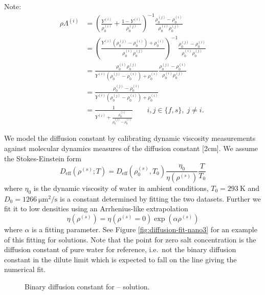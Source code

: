 \documentclass[11pt,twoside]{report}
\begin{document}
Note:
\begin{equation}
  \begin{aligned}
    \rho \Lambda^{(i)} &=
    \left(
    \frac{Y^{(i)}}{\rho^{(i)}_0} +
    \frac{1 - Y^{(i)}}{\rho^{(j)}_0}
    \right)^{-1}
    \frac{\rho^{(j)}_0 - \rho^{(i)}_0}{\rho^{(i)}_0\rho^{(j)}_0} \\
    &=
    \left(
    \frac{Y^{(i)} (\rho^{(j)}_0 - \rho^{(i)}_0) + \rho^{(i)}_0}{\rho^{(i)}_0 \rho^{(j)}_0}
    \right)^{-1}
    \frac{\rho^{(j)}_0 - \rho^{(i)}_0}{\rho^{(i)}_0\rho^{(j)}_0}
    \\
    &=
    \frac{\rho^{(i)}_0 \rho^{(j)}_0}{Y^{(i)} (\rho^{(j)}_0 - \rho^{(i)}_0) + \rho^{(i)}_0}
    \frac{\rho^{(j)}_0 - \rho^{(i)}_0}{\rho^{(i)}_0\rho^{(j)}_0}
    \\
    &=
    \frac{\rho^{(j)}_0 - \rho^{(i)}_0}{Y^{(i)} (\rho^{(j)}_0 - \rho^{(i)}_0) + \rho^{(i)}_0}
    \\
    &=
    \frac{1}{Y^{(i)} + \frac{\rho^{(i)}_0}{\rho^{(j)}_0 - \rho^{(i)}_0}}
    \qquad i,j \in \{f,s\}, \; j \ne i.
  \end{aligned}
\end{equation}

We model the diffusion constant by calibrating dynamic viscosity measurements
 against molecular dynamics measures of the diffusion constant [2cm].
We assume the Stokes-Einstein form
\begin{equation}
  D_{\textrm{eff}}(\rho^{(s)};T) = D_{\textrm{eff}}(\rho_0^{(s)}, T_0) \frac{\eta_0}{\eta(\rho^{(s)})} \frac{T}{T_0}
\end{equation}
where $\eta_0$ is the dynamic viscosity of water in ambient conditions, $T_0 = \SI{293}{\kelvin}$ and $D_0 = \SI{1266}{\micro\metre^2\per\second}$ is a constant determined by fitting the two datasets.
Further we fit it to low densities using an Arrhenius-like extrapolation
\begin{equation}
  \eta(\rho^{(s)}) = \eta(\rho^{(s)} = 0) \exp{\left( \alpha \rho^{(s)} \right)}
\end{equation}
where $\alpha$ is a fitting parameter.
See Figure \ref{fig:diffusion-fit-nano3} for an example of this fitting for  solutions.
Note that the point for zero salt concentration is the diffusion constant of pure water for reference, i.e.\ not the binary diffusion constant in the dilute limit which is expected to fall on the line giving the numerical fit. 

\begin{figure}
  \missingfigure[figwidth=\linewidth]{}
  \caption{Binary diffusion constant for -- solution.}
\end{figure}
\end{document}
